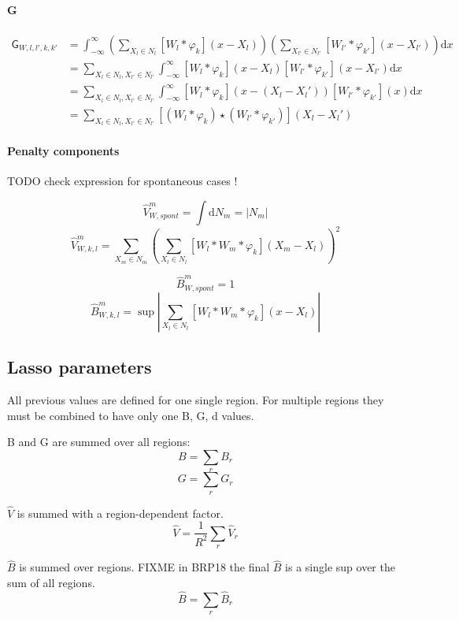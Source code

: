 \documentclass[a4paper,10pt]{article}
\newcommand\D{\mathrm{d}}
\newcommand\Convolution{\ast}
\newcommand\Correlation{\star}
\newcommand\Int[2]{\int #1 \D#2}
\newcommand\IntR[2]{\int_{-\infty}^{\infty}#1 \D#2}
\begin{document}
\paragraph{G}
\[ \begin{split}
    \mathsf{G}_{W,l,l',k,k'} & = \IntR{\left( \sum_{X_l \in N_l} [W_l \Convolution \varphi_k](x-X_l) \right)\left( \sum_{X_{l'} \in N_{l'}} [W_{l'} \Convolution \varphi_{k'}](x-X_{l'}) \right)}{x} \\
    & = \sum_{X_l \in N_l, X_{l'} \in N_{l'}} \IntR{ [W_l \Convolution \varphi_k](x-X_l) [W_{l'} \Convolution \varphi_{k'}](x-X_{l'}) }{x} \\
    & = \sum_{X_l \in N_l, X_{l'} \in N_{l'}} \IntR{ [W_l \Convolution \varphi_k](x-(X_l-X_l')) [W_{l'} \Convolution \varphi_{k'}](x) }{x} \\
    & = \sum_{X_l \in N_l, X_{l'} \in N_{l'}} [(W_l \Convolution \varphi_k) \Correlation (W_{l'} \Convolution \varphi_{k'})] (X_l-X_l')
\end{split} \]

\paragraph{Penalty components}
TODO check expression for spontaneous cases !

\[ \widehat{V}_{W,spont}^m = \Int{}{N_m} = |N_m| \]
\[ \widehat{V}_{W,k,l}^m = \sum_{X_m \in N_m} \left( \sum_{X_l \in N_l} [W_l \Convolution W_m \Convolution \varphi_k](X_m-X_l) \right)^2 \]

\[ \widehat{B}_{W,spont}^m = 1 \]
\[ \widehat{B}_{W,k,l}^m = \sup |\sum_{X_l \in N_l} [W_l \Convolution W_m \Convolution \varphi_k](x - X_l)| \]

\subsection{Lasso parameters}

All previous values are defined for one single region.
For multiple regions they must be combined to have only one B, G, d values.

B and G are summed over all regions:
\[ B = \sum_r B_r \]
\[ G = \sum_r G_r \]

$\widehat{V}$ is summed with a region-dependent factor.
\[ \widehat{V} = \frac{1}{R^2} \sum_r \widehat{V}_r \]

$\widehat{B}$ is summed over regions. FIXME in BRP18 the final $\widehat{B}$ is a single sup over the sum of all regions.
\[ \widehat{B} = \sum_r \widehat{B}_r \]
\end{document}
